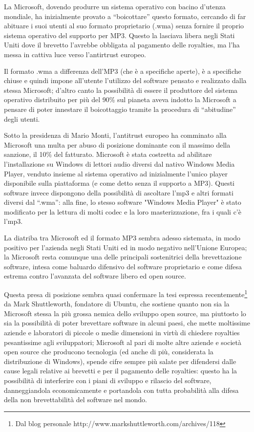 La Microsoft, dovendo produrre un sistema operativo con bacino d'utenza mondiale, ha inizialmente provato a ``boicottare'' questo formato, cercando di far abituare i suoi utenti al suo formato proprietario (.wma) senza fornire il proprio sistema operativo del supporto per MP3. Questo la lasciava libera negli Stati Uniti dove il brevetto l'avrebbe obbligata al pagamento delle royalties, ma l'ha messa in cattiva luce verso l'antirtrust europeo. 

Il formato .wma a differenza dell'MP3 (che è a specifiche aperte), è a specifiche chiuse e quindi impone all'utente l'utilizzo del software pensato e realizzato dalla stessa Microsoft; d'altro canto la possibilità di essere il produttore del sistema operativo distribuito per più del 90\% sul pianeta aveva indotto la Microsoft a pensare di poter innestare il boicottaggio tramite la procedura di ``abitudine'' degli utenti. 

Sotto la presidenza di Mario Monti, l'antitrust europeo ha comminato alla Microsoft una multa per abuso di posizione dominante con il massimo della sanzione, il 10\% del fatturato. Microsoft è stata costretta ad abilitare l'installazione su Windows di lettori audio diversi dal nativo Windows Media Player, venduto insieme al sistema operativo ad inizialmente l'unico player disponibile sulla piattaforma (e come detto senza il supporto a MP3). Questi software invece dispongono della possibilità di ascoltare l'mp3 e altri formati diversi dal ``.wma'': alla fine, lo stesso software "Windows Media Player" è stato modificato per la lettura di molti codec e la loro masterizzazione, fra i quali c'è l'mp3.

La diatriba tra Microsoft ed il formato MP3 sembra adesso sistemata, in modo positivo per l'azienda negli Stati Uniti ed in modo negativo nell'Unione Europea; la Microsoft resta comunque una delle principali sostenitrici della brevettazione software, intesa come baluardo difensivo del software proprietario e come difesa estrema contro l'avanzata del software libero ed open source. 

Questa presa di posizione sembra quasi confermare la tesi espressa recentemente\footnote{Dal blog personale  http://www.markshuttleworth.com/archives/118} da Mark Shuttleworth, fondatore di Ubuntu, che sostiene quanto non sia la Microsoft stessa la più grossa nemica dello sviluppo open source, ma piuttosto lo sia la possibilità di poter brevettare software in alcuni paesi, che mette moltissime aziende e laboratori di piccole o medie dimensioni in virtù di chiedere royalties pesantissime agli sviluppatori; Microsoft al pari di molte altre aziende e società open source che producono tecnologia (ed anche di più, considerata la distribuzione di Windows), spende cifre sempre più salate per difendersi dalle cause legali relative ai brevetti e per il pagamento delle royalties: questo ha la possibilità di interferire con i piani di sviluppo e rilascio del software, danneggiandola economicamente e portandola con tutta probabilità alla difesa della non brevettabilità del software nel mondo.

